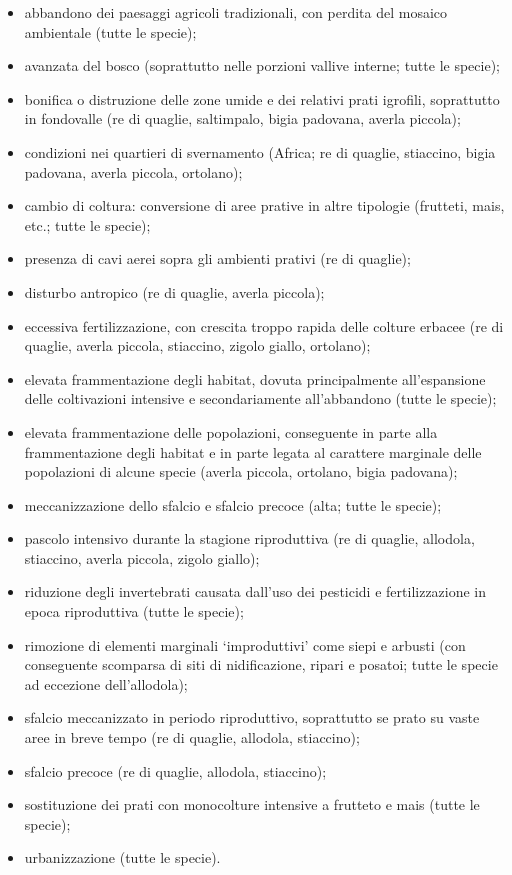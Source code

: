 \documentclass[10pt,twoside,openany,x11names,svgnames,italian,a5paper,dvipsnames,table]{memoir}
\begin{document}
\begin{itemize}\itemsep0pt
  \item abbandono dei paesaggi agricoli tradizionali, con perdita del mosaico ambientale (tutte le specie);
  \item avanzata del bosco (soprattutto nelle porzioni vallive interne; tutte le specie);
  \item bonifica o distruzione delle zone umide e dei relativi prati igrofili, soprattutto in fondovalle (re di quaglie, saltimpalo, bigia padovana, averla piccola);
  \item condizioni nei quartieri di svernamento (Africa; re di quaglie, stiaccino, bigia padovana, averla piccola, ortolano);
  \item cambio di coltura: conversione di aree prative in altre tipologie (frutteti, mais, etc.; tutte le specie);
  \item presenza di cavi aerei sopra gli ambienti prativi (re di quaglie);
  \item disturbo antropico (re di quaglie, averla piccola);
  \item eccessiva fertilizzazione, con crescita troppo rapida delle colture erbacee (re di quaglie, averla piccola, stiaccino, zigolo giallo, ortolano);
  \item elevata frammentazione degli habitat, dovuta principalmente all'espansione delle coltivazioni intensive e secondariamente all'abbandono (tutte le specie);
  \item elevata frammentazione delle popolazioni, conseguente in parte alla frammentazione degli habitat e in parte legata al carattere marginale delle popolazioni di alcune specie (averla piccola, ortolano, bigia padovana);
  \item meccanizzazione dello sfalcio e sfalcio precoce (alta; tutte le specie);
  \item pascolo intensivo durante la stagione riproduttiva (re di quaglie, allodola, stiaccino, averla piccola, zigolo giallo);
  \item riduzione degli invertebrati causata dall’uso dei pesticidi e fertilizzazione in epoca riproduttiva (tutte le specie);
  \item rimozione di elementi marginali ‘improduttivi’ come siepi e arbusti (con conseguente scomparsa di siti di nidificazione, ripari e posatoi; tutte le specie ad eccezione dell'allodola);
  \item sfalcio meccanizzato in periodo riproduttivo, soprattutto se prato su vaste aree in breve tempo (re di quaglie, allodola, stiaccino);
  \item sfalcio precoce (re di quaglie, allodola, stiaccino);
  \item sostituzione dei prati con monocolture intensive a frutteto e mais (tutte le specie); 
  \item urbanizzazione (tutte le specie).
\end{itemize}
\end{document}
